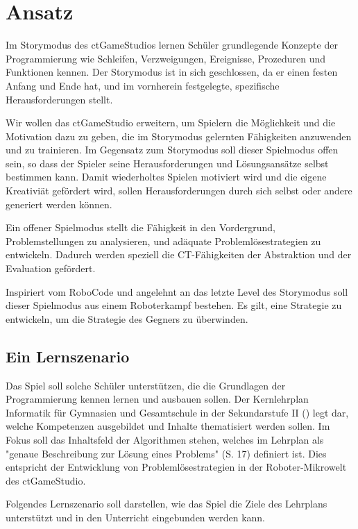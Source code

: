 \chapter{Ansatz}

Im Storymodus des ctGameStudios lernen Schüler grundlegende Konzepte der Programmierung wie
Schleifen, Verzweigungen, Ereignisse, Prozeduren und Funktionen kennen. Der Storymodus ist in sich
geschlossen, da er einen festen Anfang und Ende hat, und im vornherein festgelegte, spezifische
Herausforderungen stellt.

Wir wollen das ctGameStudio erweitern, um Spielern die Möglichkeit und die Motivation dazu zu geben,
die im Storymodus gelernten Fähigkeiten anzuwenden und zu trainieren. Im Gegensatz zum Storymodus
soll dieser Spielmodus offen sein, so dass der Spieler seine Herausforderungen und Lösungsansätze
selbst bestimmen kann. Damit wiederholtes Spielen motiviert wird und die eigene Kreativiät gefördert
wird, sollen Herausforderungen durch sich selbst oder andere generiert werden können. 

Ein offener Spielmodus stellt die Fähigkeit in den Vordergrund, Problemstellungen zu analysieren,
und adäquate Problemlösestrategien zu entwickeln. Dadurch werden speziell die CT-Fähigkeiten der
Abstraktion und der Evaluation gefördert.

Inspiriert vom RoboCode und angelehnt an das letzte Level des Storymodus soll dieser Spielmodus aus
einem Roboterkampf bestehen. Es gilt, eine Strategie zu entwickeln, um die Strategie des Gegners zu
überwinden.

\section{Ein Lernszenario}

Das Spiel soll solche Schüler unterstützen, die die Grundlagen der Programmierung kennen lernen und
ausbauen sollen. Der Kernlehrplan Informatik für Gymnasien und Gesamtschule in der Sekundarstufe II
(\cite{SchulministeriumNRW2014}) legt dar, welche Kompetenzen ausgebildet und Inhalte
thematisiert werden sollen. Im Fokus soll das Inhaltsfeld der Algorithmen stehen, welches im
Lehrplan als "genaue Beschreibung zur Lösung eines Problems" (S. 17) definiert ist. Dies entspricht
der Entwicklung von Problemlösestrategien in der Roboter-Mikrowelt des ctGameStudio.

Folgendes Lernszenario soll darstellen, wie das Spiel die Ziele des Lehrplans unterstützt und in den
Unterricht eingebunden werden kann.

